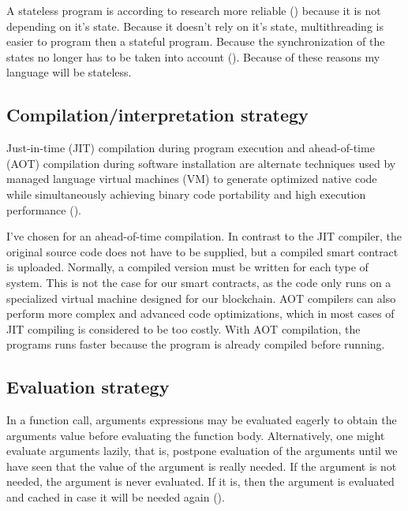 \documentclass{uva-inf-article}
\begin{document}
\par A stateless program is according to research more reliable (\cite{Merelo2018}) because it is not depending on it's state.
Because it doesn't rely on it's state, multithreading is easier to program then a stateful program. 
Because the synchronization of the states no longer has to be taken into account (\cite{Merelo2018}).
Because of these reasons my language will be stateless.

\newpage
\subsection{Compilation/interpretation strategy}
\par Just-in-time (JIT) compilation during program execution and ahead-of-time (AOT) compilation during 
software installation are alternate techniques used by managed language virtual machines (VM) to 
generate optimized native code while simultaneously achieving binary code portability and 
high execution performance (\cite{wade2017aot}).
\vspace{5mm}

\par I've chosen for an ahead-of-time compilation. In contrast to the JIT compiler, 
the original source code does not have to be supplied, but a compiled smart contract is uploaded.
Normally, a compiled version must be written for each type of system. 
This is not the case for our smart contracts, as the code only runs on a specialized virtual machine 
designed for our blockchain. AOT compilers can also perform more complex and advanced code optimizations,
which in most cases of JIT compiling is considered to be too costly.
With AOT compilation, the programs runs faster because the program is already compiled before running.

\subsection{Evaluation strategy}
\par In a function call, arguments expressions may be evaluated eagerly 
to obtain the arguments value before evaluating the function body.
Alternatively, one might evaluate arguments lazily, that is, postpone evaluation 
of the arguments until we have seen that the value of the argument is really needed.
If the argument is not needed, the argument is never evaluated. If it is, 
then the argument is evaluated and cached in case it will be needed again
(\cite{Sestoft2012-2}).
\vspace{5mm}
\end{document}
